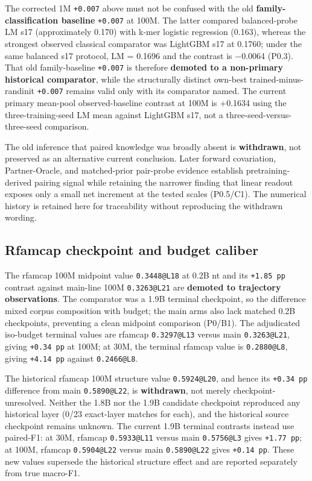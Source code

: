 The corrected 1M \texttt{+0.007} above must not be confused with the old \textbf{family-classification baseline} \texttt{+0.007} at 100M. The latter compared balanced-probe LM s17 (approximately 0.170) with k-mer logistic regression (0.163), whereas the strongest observed classical comparator was LightGBM s17 at 0.1760; under the same balanced s17 protocol, LM = 0.1696 and the contrast is \(-\)0.0064 (P0.3). That old family-baseline \texttt{+0.007} is therefore \textbf{demoted to a non-primary historical comparator}, while the structurally distinct own-best trained-minus-randinit \texttt{+0.007} remains valid only with its comparator named. The current primary mean-pool observed-baseline contrast at 100M is +0.1634 using the three-training-seed LM mean against LightGBM s17, not a three-seed-versus-three-seed comparison.

The old inference that paired knowledge was broadly absent is \textbf{withdrawn}, not preserved as an alternative current conclusion. Later forward covariation, Partner-Oracle, and matched-prior pair-probe evidence establish pretraining-derived pairing signal while retaining the narrower finding that linear readout exposes only a small net increment at the tested scales (P0.5/C1). The numerical history is retained here for traceability without reproducing the withdrawn wording.

\hypertarget{a.2-rfamcap-checkpoint-and-budget-caliber}{%
\subsection{Rfamcap checkpoint and budget caliber}\label{a.2-rfamcap-checkpoint-and-budget-caliber}}

The rfamcap 100M midpoint value \texttt{0.3448@L18} at 0.2B nt and its \texttt{+1.85\ pp} contrast against main-line 100M \texttt{0.3263@L21} are \textbf{demoted to trajectory observations}. The comparator was a 1.9B terminal checkpoint, so the difference mixed corpus composition with budget; the main arms also lack matched 0.2B checkpoints, preventing a clean midpoint comparison (P0/B1). The adjudicated iso-budget terminal values are rfamcap \texttt{0.3297@L13} versus main \texttt{0.3263@L21}, giving \texttt{+0.34\ pp} at 100M; at 30M, the terminal rfamcap value is \texttt{0.2880@L8}, giving \texttt{+4.14\ pp} against \texttt{0.2466@L8}.

The historical rfamcap 100M structure value \texttt{0.5924@L20}, and hence its \texttt{+0.34\ pp} difference from main \texttt{0.5890@L22}, is \textbf{withdrawn}, not merely checkpoint-unresolved. Neither the 1.8B nor the 1.9B candidate checkpoint reproduced any historical layer (0/23 exact-layer matches for each), and the historical source checkpoint remains unknown. The current 1.9B terminal contrasts instead use paired-F1: at 30M, rfamcap \texttt{0.5933@L11} versus main \texttt{0.5756@L3} gives \texttt{+1.77\ pp}; at 100M, rfamcap \texttt{0.5904@L22} versus main \texttt{0.5890@L22} gives \texttt{+0.14\ pp}. These new values supersede the historical structure effect and are reported separately from true macro-F1.

